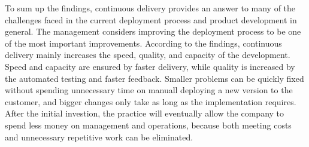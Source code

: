 \documentclass[english]{tktltiki2}
\theoremstyle{definition}
\theoremstyle{remark}
\begin{document}


To sum up the findings, continuous delivery provides an answer to many of the challenges faced in the current deployment process and product development in general. The management considers improving the deployment process to be one of the most important improvements. According to the findings, continuous delivery mainly increases the speed, quality, and capacity of the development. Speed and capacity are ensured by faster delivery, while quality is increased by the automated testing and faster feedback. Smaller problems can be quickly fixed without spending unnecessary time on manuall deploying a new version to the customer, and bigger changes only take as long as the implementation requires. After the initial investion, the practice will eventually allow the company to spend less money on management and operations, because both meeting costs and unnecessary repetitive work can be eliminated. %





%

\end{document}
